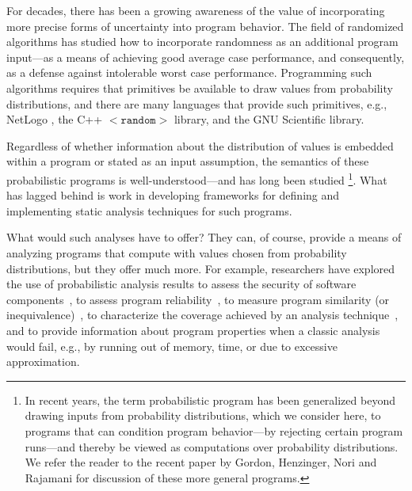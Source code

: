 For decades, there has been a growing awareness of the value of 
incorporating more precise forms of uncertainty into program behavior.  
The field of randomized algorithms has studied how to incorporate
randomness as an additional program input---as a means of achieving
good average case performance, and consequently, as a defense against
intolerable worst case performance.
Programming such algorithms requires that primitives be available
to draw values from probability distributions, and there are many
languages that provide such primitives, e.g., NetLogo \cite{tisue2004netlogo},
the C++ \texttt{$\mathtt{<random>}$} library, and the GNU Scientific library.

Regardless of whether information about the distribution of
values is embedded within a program or stated as an input assumption,
the semantics of these probabilistic programs is well-understood---and
has long been studied 
\cite{kozen1981semantics,kozen1983probabilistic,jones1990probabilistic,morgan1996probabilistic}
\footnote{In recent
years, the term probabilistic program has been generalized beyond
drawing inputs from probability distributions, which we
consider here, to programs that can condition program behavior---by
rejecting certain program runs---and thereby be viewed as
computations over probability distributions.  We refer the reader to the
recent paper by Gordon, Henzinger, Nori and Rajamani \cite{Gordon2014}
for discussion of these more general programs.}. 
What has lagged behind is work in developing frameworks for 
defining and implementing static analysis techniques for such programs.

What would such analyses have to offer?
They can, of course, provide a means of analyzing programs that compute
with values chosen from probability distributions, but they offer much
more.
For example, researchers have explored the use of probabilistic analysis
results to assess the security of software components~\cite{mardziel2013dynamic},
to assess program reliability~\cite{Filieri2013}, to measure program
similarity (or inequivalence)~\cite{Geldenhuys2012}, 
to characterize the coverage
achieved by an analysis technique~\cite{DwyerASE11}, and to provide information
about program properties when a classic analysis would fail, e.g.,
by running out of memory, time, or due to excessive approximation.

